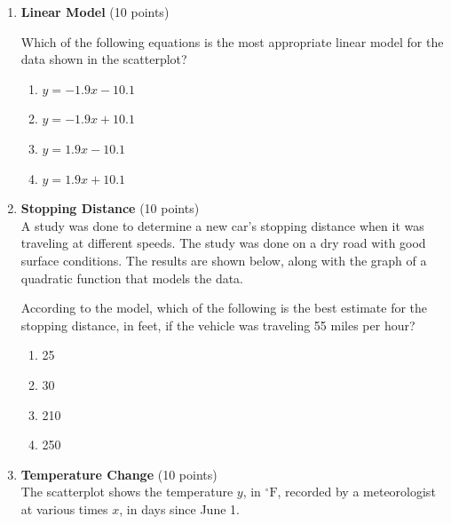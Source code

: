 \begin{enumerate}
  \item \textbf{Linear Model} (10 points)\\

  Which of the following equations is the most appropriate linear model for the data shown in the scatterplot?
  \begin{enumerate}[label=(\Alph*)]
    \item $y=-1.9x-10.1$
    \item $y=-1.9x+10.1$
    \item $y=1.9x-10.1$
    \item $y=1.9x+10.1$
  \end{enumerate}
  \begin{subanswer}
  \end{subanswer}

  \newpage

  \item \textbf{Stopping Distance} (10 points)\\
  A study was done to determine a new car's stopping distance when it was traveling at different speeds. The study was done on a dry road with good surface conditions. The results are shown below, along with the graph of a quadratic function that models the data.


  According to the model, which of the following is the best estimate for the stopping distance, in feet, if the vehicle was traveling 55 miles per hour?
  \begin{enumerate}[label=(\Alph*)]
    \item 25
    \item 30
    \item 210
    \item 250
  \end{enumerate}
  \begin{subanswer}
  \end{subanswer}


  \newpage

  \item \textbf{Temperature Change} (10 points)\\
  The scatterplot shows the temperature $y$, in ${ }^{\circ} \mathrm{F}$, recorded by a meteorologist at various times $x$, in days since June 1.


\end{enumerate}

